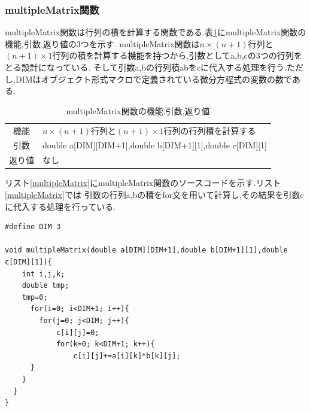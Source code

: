 \documentclass[a4j]{jarticle}
\begin{document}
      \subsubsection{multipleMatrix関数}
      multipleMatrix関数は行列の積を計算する関数である.表\ref{multipleMatrixtable}にmultipleMatrix関数の機能,引数,返り値の3つを示す.
      multipleMatrix関数は$n \times (n+1)$行列と$(n+1) \times 1$行列の積を計算する機能を持つから,引数としてa,b,cの3つの行列をとる設計になっている.
      そして引数a,bの行列積abをcに代入する処理を行う.ただし,DIMはオブジェクト形式マクロで定義されている微分方程式の変数の数である.
      \begin{table}[H]
        \caption{multipleMatrix関数の機能,引数,返り値}
        \label{multipleMatrixtable}
        \begin{center}
            \begin{tabular}{c|l}\hline
          機能 & $n \times (n+1)$行列と$(n+1) \times 1$行列の行列積を計算する\\
          引数 & double a[DIM][DIM+1],double b[DIM+1][1],double c[DIM][1] \\
          返り値 & なし\\ \hline
            \end{tabular}
        \end{center}
        \end{table}

        リスト\ref{multipleMatrix}にmultipleMatrix関数のソースコードを示す.リスト\ref{multipleMatrix}では
        引数の行列a,bの積をfor文を用いて計算し,その結果を引数cに代入する処理を行っている.
    \begin{lstlisting}[basicstyle=\ttfamily\footnotesize, frame=single,label=multipleMatrix,caption=multipleMatrix関数のコード]
#define DIM 3

void multipleMatrix(double a[DIM][DIM+1],double b[DIM+1][1],double c[DIM][1]){
    int i,j,k;
    double tmp;
    tmp=0;
      for(i=0; i<DIM+1; i++){
        for(j=0; j<DIM; j++){
            c[i][j]=0;
            for(k=0; k<DIM+1; k++){
	            c[i][j]+=a[i][k]*b[k][j];
      }
    }
  }
}
    \end{lstlisting}
\end{document}
